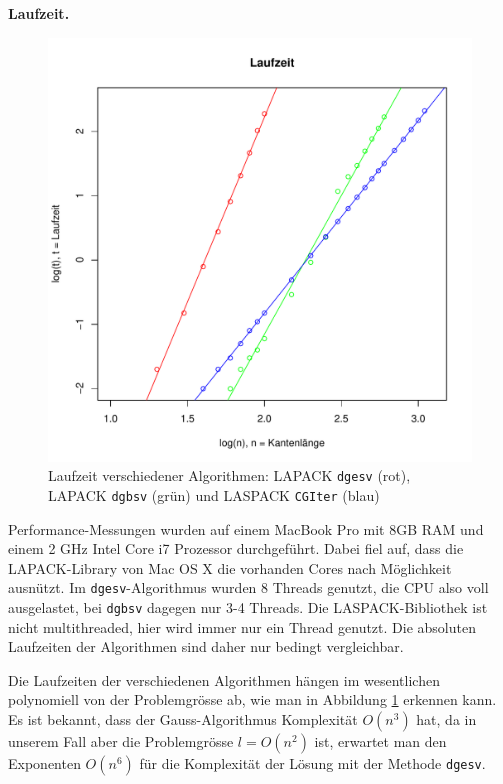 {\bf Laufzeit.}
\begin{figure}
\begin{center}
\includegraphics[width=\hsize]{graphics/runtime}
\end{center}
\caption{Laufzeit verschiedener Algorithmen: LAPACK {\tt dgesv} (rot),
LAPACK {\tt dgbsv} (grün)
und LASPACK {\tt CGIter} (blau)\label{runtime}}
\end{figure}
Performance-Messungen wurden auf einem MacBook Pro mit 8GB RAM und
einem 2 GHz Intel Core i7 Prozessor durchgeführt. Dabei fiel auf, dass
die LAPACK-Library von Mac OS X die vorhanden Cores nach Möglichkeit
ausnützt. Im {\tt dgesv}-Algorithmus wurden 8 Threads genutzt, die
CPU also voll ausgelastet, bei {\tt dgbsv} dagegen nur 3-4 Threads.
Die LASPACK-Bibliothek ist nicht multithreaded, hier wird immer nur ein
Thread genutzt. Die absoluten Laufzeiten der Algorithmen sind daher nur
bedingt vergleichbar.


Die Laufzeiten der verschiedenen Algorithmen hängen im wesentlichen
polynomiell von der Problemgrösse ab, wie man in Abbildung \ref{runtime}
erkennen kann.  Es ist bekannt, dass der Gauss-Algorithmus Komplexität
$O(n^3)$ hat, da in unserem Fall aber die Problemgrösse $l=O(n^2)$ ist,
erwartet man den Exponenten $O(n^6)$ für die Komplexität der Lösung
mit der Methode {\tt dgesv}.


